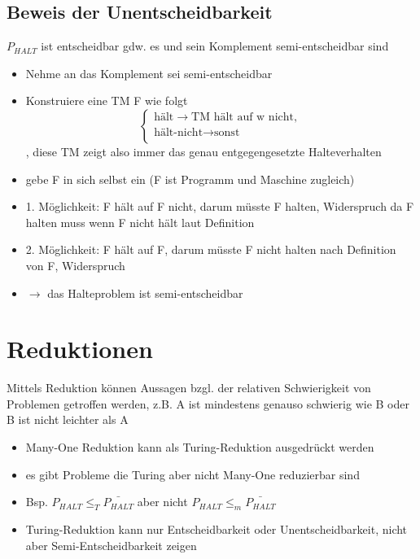 \documentclass[12pt,a4paper]{article}
\begin{document}
\subsection{Beweis der Unentscheidbarkeit}
$P_{HALT}$ ist entscheidbar gdw. es und sein Komplement semi-entscheidbar sind
\begin{itemize}
\item Nehme an das Komplement sei semi-entscheidbar
\item Konstruiere eine TM F wie folgt$$
\begin{cases}
\text{hält} \rightarrow \text{TM hält auf w nicht},\\
\text{hält-nicht} \rightarrow \text{sonst}\\
\end{cases}
$$, diese TM zeigt also immer das genau entgegengesetzte Halteverhalten
\item gebe F in sich selbst ein (F ist Programm und Maschine zugleich)
\item 1. Möglichkeit: F hält auf F nicht, darum müsste F halten, Widerspruch da F halten muss wenn F nicht hält laut Definition
\item 2. Möglichkeit: F hält auf F, darum müsste F nicht halten nach Definition von F, Widerspruch
\item $\rightarrow$ das Halteproblem ist semi-entscheidbar
\end{itemize}

\section{Reduktionen}
Mittels Reduktion können Aussagen bzgl. der relativen Schwierigkeit von Problemen getroffen werden, z.B. A ist mindestens genauso schwierig wie B oder B ist nicht leichter als A
\begin{itemize}
\item Many-One Reduktion kann als Turing-Reduktion ausgedrückt werden
\item es gibt Probleme die Turing aber nicht Many-One reduzierbar sind
\item Bsp. $P_{HALT} \leq_T \bar{P_{HALT}}$ aber nicht $P_{HALT} \leq_m \bar{P_{HALT}}$
\item Turing-Reduktion kann nur Entscheidbarkeit oder Unentscheidbarkeit, nicht aber Semi-Entscheidbarkeit zeigen
\end{itemize}
\end{document}
